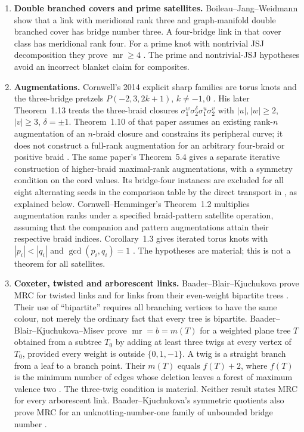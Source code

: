 \documentclass[11pt]{article}
\newcommand{\mr}{\operatorname{mr}}
\begin{document}
\begin{enumerate}
\item \textbf{Double branched covers and prime satellites.}
Boileau--Jang--Weidmann show that a link with meridional rank three and
graph-manifold double branched cover has bridge number three. A
four-bridge link in that cover class has meridional rank four.
For a prime knot with nontrivial JSJ decomposition they prove
$\mr\ge4$ \cite{bjw}. The prime and nontrivial-JSJ hypotheses avoid an
incorrect blanket claim for composites.

\item \textbf{Augmentations.} Cornwell's 2014 explicit sharp families are
torus knots and the three-bridge pretzels $P(-2,3,2k+1)$,
$k\ne-1,0$ \cite[Theorems~1.3--1.4]{cornwell}.
His later Theorem~1.13 treats the three-braid closures
$\sigma_1^w\sigma_2^\delta\sigma_1^u\sigma_2^v$ with
$|u|,|w|\ge2$, $|v|\ge3$, $\delta=\pm1$.
Theorem~1.10 of that paper assumes an existing rank-$n$
augmentation of an $n$-braid closure and constrains its peripheral
curve; it does not construct a full-rank augmentation for an
arbitrary four-braid or positive braid \cite{cornwell17}.
The same paper's Theorem~5.4 gives a separate iterative construction
of higher-braid maximal-rank augmentations, with a symmetry condition
on the cord values. Its bridge-four instances are excluded for all eight alternating
seeds in the comparison table by the direct transport
in , as explained below.
Cornwell--Hemminger's Theorem~1.2 multiplies augmentation ranks
under a specified braid-pattern satellite operation, assuming that
the companion and pattern augmentations attain their respective
braid indices. Corollary~1.3 gives iterated torus knots with
$|p_i|<|q_i|$ and $\gcd(p_i,q_i)=1$ \cite{ch}.
The hypotheses are material; this is not a theorem for all satellites.

\item \textbf{Coxeter, twisted and arborescent links.}
Baader--Blair--Kjuchukova prove MRC for twisted links and for links from
their even-weight bipartite trees \cite{bbk}. Their use of ``bipartite''
requires all branching vertices to have the same colour, not merely
the ordinary fact that every tree is bipartite.
Baader--Blair--Kjuchukova--Misev prove $\mr=b=m(T)$ for a weighted plane
tree $T$ obtained from a subtree $T_0$ by adding at least three twigs
at every vertex of $T_0$, provided every weight is outside
$\{0,1,-1\}$. A twig is a straight branch from a leaf to a branch
point. Their $m(T)$ equals $f(T)+2$, where $f(T)$ is the minimum
number of edges whose deletion leaves a forest of maximum valence two
\cite[Theorems 1 and 2]{twigs}. The three-twig condition is material.
Neither result states MRC for every arborescent link.
Baader--Kjuchukova's symmetric quotients also prove MRC for an
unknotting-number-one family of unbounded bridge number \cite{bk}.


\end{enumerate}
\end{document}
